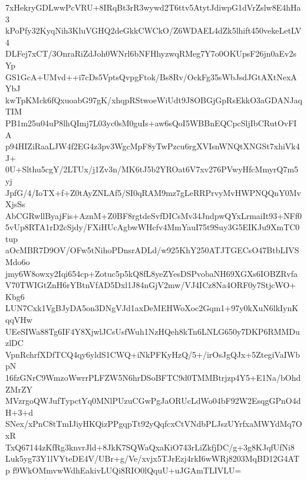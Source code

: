 7xHekryGDLwwPcVRU+8IRqBt3rR3wywd2T6ttv5AtytJdiwpG1dVrZslw8E4hHa3
kPoPfy32KyqNih3KluVGHQ2deGkkCWCkO/Z6WDAEL4dZk5lhift450vekeLetLV4
DLFej7xCT/3OnraRiZdJoh0WNrl6bNFHhyzwqRMeg7Y7o0OKUpsF26jn0aEv2sYp
GS1GcA+UMvd++i7cDs5VptsQvpgFtok/Bs8Rv/OckFg35sWbJsdJGtAXtNexAYbJ
kwTpKMck6fQxuoabG97gK/xhqpRStwoeWiUdt9J8OBGjGpRsEkkO3aGDANJaqTIM
PB1m25u04uP8lhQImj7L03yc0sM0guIs+aw6sQoI5WBBnEQCpcSljIbCRutOvFIA
p94HIZiRaaLJW4f2EG4z3pv3WgcMpF8yTwPzcu6rgXVIsnWNQtXNGSt7xhiVk4J+
0U+Slthu5cgY/2LTUx/j1Zv3n/MK6tJ5b2YROat6V7xv276PVwyHfcMmyrQ7m5yj
JpfG/4/IoTX+f+Z0tAyZNLAf5/SI0qRAM9mz7gLeRRPrvyMvHWPNQQnY0MvXjsSs
AbCGRwllByajFis+AznM+Z0BF8rgtdeSvfDICsMv34JndpwQYxLrmaiIt93+NFf0
5vUp8RTA1rD2cSjdy/FXiHUcAgbwWHcfv4MmYauI75t9Suy3G5EIKJu9XmTC0tup
aOcMBR7D9OV/OFw5tNihoPDnsrADLd/w925KhY250ATJTGECsO47BtbLIVSMdo6o
jmy6W8owxy2Iqi654cp+Zotuc5p5kQ8fL8yeZYesDSPvobaNH69XGXs6IOBZRvfa
V70TWIGtZnH6rYBtnVfAD5Dxl1J84nGjV2mw/VJ4ICz8Na4ORF0y7StjcWO+Kbg6
LUN7Cxk1VgBJyDA5on3DNgVJd1axDeMEHWoXoc2Gqm1+97y0kXuN6lkIynKqqVHw
UEeSIWa88Tg6IF4Y8XjwlJCsUsfWuh1NzHQeh8kTn6LNLG650y7DKP6RMMDuzlDC
VpnRchrfXDfTCQ4qy6yldS1CWQ+iNkPFKyHzQ/5+/irOsJgQJx+5ZtegiVaIWbpN
16fzGNrC9WmzoWwrrPLFZW5N6hrDSoBFTC9d0TMMBtrjzp4Y5+E1Na/bOhdZMrZY
MVzrgoQWJufTypctYq0MNlPUzuCGwPgJaORUcLdWo04bF92W2EsqgGPnO4dH+3+d
SNex/xPnC8tTmIJiyHKQizPPgqpTt92yQqfcxCtVNdbPLJszUYrfxaMWYdMq7OxR
TxQ67144zKfRg3knvrJld+8JkK7SQWaQxaKiO743rLiZkfjDC/g+3g8KJqfUfNi8
Luk5yg73Y1lVYteDE4V/UBr+g/Ve/xvjx5TJrEzj4rkI6wWRj8203MqBD12G4ATp
f9WkOMmvwWdhEakivLUQi8RIO0lQquU+uJGAmTLIVLU=
